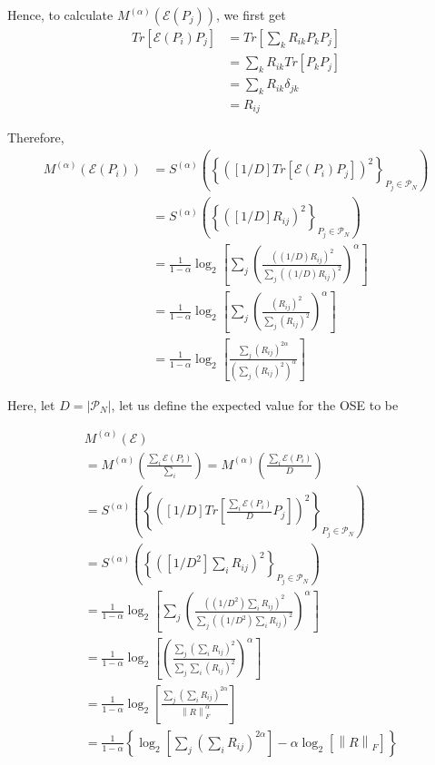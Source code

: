 \documentclass[%
 reprint,
superscriptaddress,
 amsmath,amssymb,
 aps,
]{revtex4-2}
\newcommand{\E}{\mathcal{E}}
\newcommand{\norm}[1]{\left\lVert#1\right\rVert}
\begin{document}
Hence, to calculate $M^{(\alpha)}(\E(P_j))$, we first get
\begin{equation}
\begin{split}
    Tr[\E(P_i)P_j]&=Tr\left[\sum_kR_{ik}P_k P_j\right]\\
    &=\sum_kR_{ik}Tr\left[P_kP_j\right]\\
    &=\sum_kR_{ik}\delta_{jk}\\
    &=R_{ij}
\end{split}
\end{equation}

Therefore,
\begin{equation}
\begin{split}
    M^{(\alpha)}(\E(P_i))&=S^{(\alpha)}\left(\left\{ ([1/D]Tr[\E(P_i)P_j])^2\right\}_{P_j\in\mathcal{P}_N}\right)\\
    &=S^{(\alpha)}\left(\left\{ ([1/D]R_{ij})^2\right\}_{P_j\in\mathcal{P}_N}\right)\\
    &=\frac{1}{1-\alpha}\log_2\left[\sum_j \left(\frac{\left((1/D){R_{ij}}\right)^2}{\sum_j\left((1/D){R_{ij}}\right)^2}\right)^\alpha\right]\\
    &=\frac{1}{1-\alpha}\log_2\left[\sum_j \left(\frac{\left({R_{ij}}\right)^2}{\sum_j\left({R_{ij}}\right)^2}\right)^\alpha\right]\\
    &=\frac{1}{1-\alpha}\log_2\left[ \frac{\sum_j\left({R_{ij}}\right)^{2\alpha}}{\left(\sum_j\left({R_{ij}}\right)^2\right)^\alpha}\right]
\end{split}
\end{equation}

Here, let $D=|\mathcal{P}_N|$, let us define the expected value for the OSE to be

\begin{equation}
\begin{split}
    &M^{(\alpha)}(\E)\\
    &=M^{(\alpha)}\left(\frac{\sum_i\E(P_i)}{\sum_i}\right) = M^{(\alpha)}\left(\frac{\sum_i\E(P_i)}{D}\right)\\
    &=S^{(\alpha)}\left(\left\{ \left([1/D]Tr\left[\frac{\sum_i\E(P_i)}{D}P_j\right]\right)^2\right\}_{P_j\in\mathcal{P}_N}\right)\\
    &=S^{(\alpha)}\left(\left\{ \left([1/D^2]\sum_iR_{ij}\right)^2\right\}_{P_j\in\mathcal{P}_N}\right)\\
    &=\frac{1}{1-\alpha}\log_2\left[\sum_j \left(\frac{\left((1/D^2)\sum_i{R_{ij}}\right)^2}{\sum_j\left((1/D^2){\sum_iR_{ij}}\right)^2}\right)^\alpha\right]\\
    &=\frac{1}{1-\alpha}\log_2\left[ \left(\frac{\sum_j\left(\sum_i{R_{ij}}\right)^2}{\sum_j\sum_i\left({R_{ij}}\right)^2}\right)^\alpha\right]\\
    &=\frac{1}{1-\alpha}\log_2\left[ \frac{\sum_j\left(\sum_i{R_{ij}}\right)^{2\alpha}}{\norm{R}_F^\alpha}\right]\\
    &=\frac{1}{1-\alpha}\left\{ \log_2\left[ \sum_j\left(\sum_i{R_{ij}}\right)^{2\alpha}\right] -\alpha\log_2\left[ \norm{R}_F\right]\right\}
\end{split}
\label{eq:OSE_bound_channel_frobenius}
\end{equation}
\end{document}
